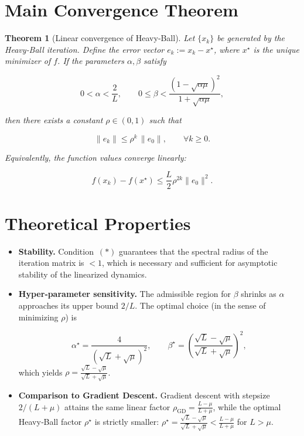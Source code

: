 \documentclass{article}
\newtheorem{theorem}{Theorem}
\begin{document}
\section*{Main Convergence Theorem}
\begin{theorem}[Linear convergence of Heavy‑Ball]\label{thm:hb}
Let $\{x_k\}$ be generated by the Heavy‑Ball iteration.
Define the error vector $e_k:=x_k-x^\star$, where $x^\star$ is the unique
minimizer of $f$.
If the parameters $\alpha,\beta$ satisfy  

\[
0<\alpha<\frac{2}{L},\qquad
0\le \beta<\frac{(1-\sqrt{\alpha\mu})^2}{1+\sqrt{\alpha\mu}},
\tag{*}
\]

then there exists a constant $\rho\in(0,1)$ such that  

\[
\|e_{k}\| \le \rho^{k}\,\|e_{0}\|,\qquad \forall k\ge 0 .
\]

Equivalently, the function values converge linearly:

\[
f(x_k)-f(x^\star) \le \frac{L}{2}\rho^{2k}\|e_{0}\|^{2}.
\]
\end{theorem}

\section*{Theoretical Properties}
\begin{itemize}
  \item \textbf{Stability.} Condition~$(*)$ guarantees that the spectral radius
        of the iteration matrix is $<1$, which is necessary and sufficient
        for asymptotic stability of the linearized dynamics.
  \item \textbf{Hyper‑parameter sensitivity.}
        The admissible region for $\beta$ shrinks as $\alpha$ approaches its
        upper bound $2/L$. The optimal choice (in the sense of minimizing $\rho$)
        is  

        \[
        \alpha^\star=\frac{4}{(\sqrt{L}+\sqrt{\mu})^{2}},\qquad
        \beta^\star=\left(\frac{\sqrt{L}-\sqrt{\mu}}{\sqrt{L}+\sqrt{\mu}}\right)^{2},
        \]
        which yields $\rho = \frac{\sqrt{L}-\sqrt{\mu}}{\sqrt{L}+\sqrt{\mu}}$.
  \item \textbf{Comparison to Gradient Descent.}
        Gradient descent with stepsize $2/(L+\mu)$ attains the same linear
        factor $\rho_{\text{GD}} = \frac{L-\mu}{L+\mu}$, while the optimal
        Heavy‑Ball factor $\rho^\star$ is strictly smaller:
        $\rho^\star = \frac{\sqrt{L}-\sqrt{\mu}}{\sqrt{L}+\sqrt{\mu}} < 
        \frac{L-\mu}{L+\mu}$ for $L>\mu$.
\end{itemize}
\end{document}
